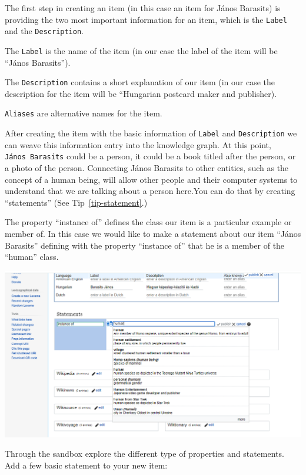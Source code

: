 \documentclass[
  letterpaper,
  DIV=11,
  numbers=noendperiod]{scrreprt}
\begin{document}
The first step in creating an item (in this case an item for János
Barasits) is providing the two most important information for an item,
which is the \texttt{Label} and the \texttt{Description}.

The \texttt{Label} is the name of the item (in our case the label of the
item will be ``János Barasits'').

The \texttt{Description} contains a short explanation of our item (in
our case the description for the item will be ``Hungarian postcard maker
and publisher).

\texttt{Aliases} are alternative names for the item.

After creating the item with the basic information of \texttt{Label} and
\texttt{Description} we can weave this information entry into the
knowledge graph. At this point, \texttt{János\ Barasits} could be a
person, it could be a book titled after the person, or a photo of the
person. Connecting János Barasits to other entities, such as the concept
of a human being, will allow other people and their computer systems to
understand that we are talking about a person here.You can do that by
creating ``statements'' (See Tip~\ref{tip-statement}.)

The property ``instance of'' defines the class our item is a particular
example or member of. In this case we would like to make a statement
about our item ``János Barasits'' defining with the property ``instance
of'' that he is a member of the ``human'' class.

\begin{center}
\includegraphics{png/wikidata-tutorial/wikidata-create-new-item-Janos-Barasits-20240204-2.png}
\end{center}

Through the sandbox explore the different type of properties and
statements. Add a few basic statement to your new item:
\end{document}
